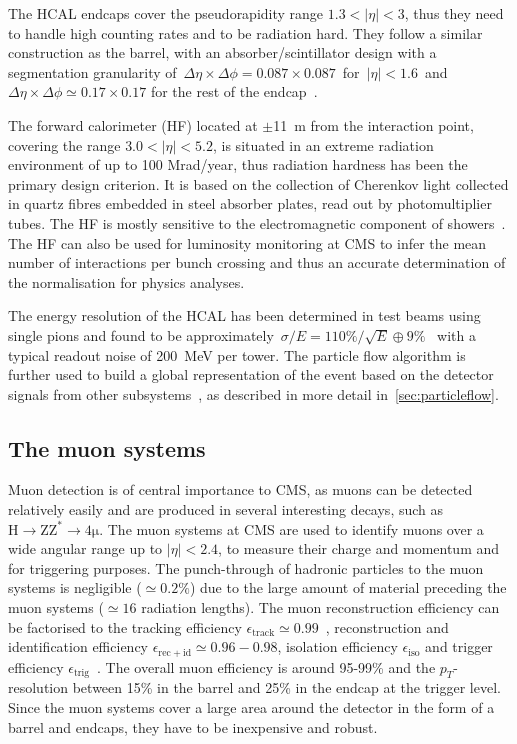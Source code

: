 The HCAL endcaps cover the pseudorapidity range $1.3 < |\eta| < 3$, thus they need to handle high counting rates and to be radiation hard. They follow a similar construction as the barrel, with an absorber/scintillator design with a segmentation granularity of~$\Delta \eta \times \Delta \phi = 0.087 \times 0.087$~for~$|\eta| < 1.6$~and~$\Delta \eta \times \Delta \phi \simeq 0.17 \times 0.17$ for the rest of the endcap~\cite{Chatrchyan:2008aa}.

The forward calorimeter (HF) located at $\pm$11~m from the interaction point, covering the range $3.0 < |\eta| < 5.2$, is situated in an extreme radiation environment of up to 100 Mrad/year, thus radiation hardness has been the primary design criterion. It is based on the collection of Cherenkov light collected in quartz fibres embedded in steel absorber plates, read out by photomultiplier tubes. The HF is mostly sensitive to the electromagnetic component of showers~\cite{Akchurin:2003tp}. The HF can also be used for luminosity monitoring at CMS to infer the mean number of interactions per bunch crossing and thus an accurate determination of the normalisation for physics analyses.

The energy resolution of the HCAL has been determined in test beams using single pions and found to be approximately~$\sigma/E = 110\%/\sqrt{E} \oplus 9\%$~\cite{Elvira:2004iya} with a typical readout noise of 200~MeV per tower. The particle flow algorithm is further used to build a global representation of the event based on the detector signals from other subsystems~\cite{CMS-PRF-14-001}, as described in more detail in~\cref{sec:particleflow}.

\subsection{The muon systems}
Muon detection is of central importance to CMS, as muons can be detected relatively easily and are produced in several interesting decays, such as $\mathrm{H} \rightarrow \mathrm{Z} \mathrm{Z}^* \rightarrow 4 \mathrm{\mu}$. The muon systems at CMS are used to identify muons over a wide angular range up to $|\eta| < 2.4$, to measure their charge and momentum and for triggering purposes. The punch-through of hadronic particles to the muon systems is negligible ($\simeq 0.2\%$) due to the large amount of material preceding the muon systems ($\simeq16$ radiation lengths). The muon reconstruction efficiency can be factorised to the tracking efficiency $\epsilon_{\mathrm{track}} \simeq 0.99$~\cite{Khachatryan:2010xn}, reconstruction and identification efficiency $\epsilon_{\mathrm{rec+id}}\simeq 0.96-0.98$, isolation efficiency $\epsilon_{\mathrm{iso}}$ and trigger efficiency $\epsilon_{\mathrm{trig}}$~\cite{Chatrchyan:2012xi}. The overall muon efficiency is around 95-99\% and the $p_T$-resolution between 15\% in the barrel and 25\% in the endcap at the trigger level. Since the muon systems cover a large area around the detector in the form of a barrel and endcaps, they have to be inexpensive and robust.

